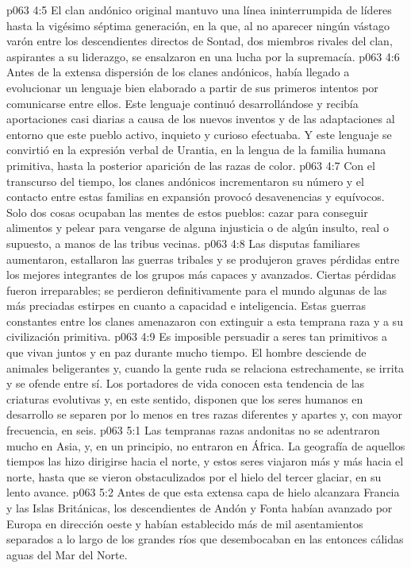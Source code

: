 \vs p063 4:5 \pc El clan andónico original mantuvo una línea ininterrumpida de líderes hasta la vigésimo séptima generación, en la que, al no aparecer ningún vástago varón entre los descendientes directos de Sontad, dos miembros rivales del clan, aspirantes a su liderazgo, se ensalzaron en una lucha por la supremacía.
\vs p063 4:6 Antes de la extensa dispersión de los clanes andónicos, había llegado a evolucionar un lenguaje bien elaborado a partir de sus primeros intentos por comunicarse entre ellos. Este lenguaje continuó desarrollándose y recibía aportaciones casi diarias a causa de los nuevos inventos y de las adaptaciones al entorno que este pueblo activo, inquieto y curioso efectuaba. Y este lenguaje se convirtió en la expresión verbal de Urantia, en la lengua de la familia humana primitiva, hasta la posterior aparición de las razas de color.
\vs p063 4:7 \pc Con el transcurso del tiempo, los clanes andónicos incrementaron su número y el contacto entre estas familias en expansión provocó desavenencias y equívocos. Solo dos cosas ocupaban las mentes de estos pueblos: cazar para conseguir alimentos y pelear para vengarse de alguna injusticia o de algún insulto, real o supuesto, a manos de las tribus vecinas.
\vs p063 4:8 Las disputas familiares aumentaron, estallaron las guerras tribales y se produjeron graves pérdidas entre los mejores integrantes de los grupos más capaces y avanzados. Ciertas pérdidas fueron irreparables; se perdieron definitivamente para el mundo algunas de las más preciadas estirpes en cuanto a capacidad e inteligencia. Estas guerras constantes entre los clanes amenazaron con extinguir a esta temprana raza y a su civilización primitiva.
\vs p063 4:9 Es imposible persuadir a seres tan primitivos a que vivan juntos y en paz durante mucho tiempo. El hombre desciende de animales beligerantes y, cuando la gente ruda se relaciona estrechamente, se irrita y se ofende entre sí. Los portadores de vida conocen esta tendencia de las criaturas evolutivas y, en este sentido, disponen que los seres humanos en desarrollo se separen por lo menos en tres razas diferentes y apartes y, con mayor frecuencia, en seis.
\vs p063 5:1 Las tempranas razas andonitas no se adentraron mucho en Asia, y, en un principio, no entraron en África. La geografía de aquellos tiempos las hizo dirigirse hacia el norte, y estos seres viajaron más y más hacia el norte, hasta que se vieron obstaculizados por el hielo del tercer glaciar, en su lento avance.
\vs p063 5:2 Antes de que esta extensa capa de hielo alcanzara Francia y las Islas Británicas, los descendientes de Andón y Fonta habían avanzado por Europa en dirección oeste y habían establecido más de mil asentamientos separados a lo largo de los grandes ríos que desembocaban en las entonces cálidas aguas del Mar del Norte.
